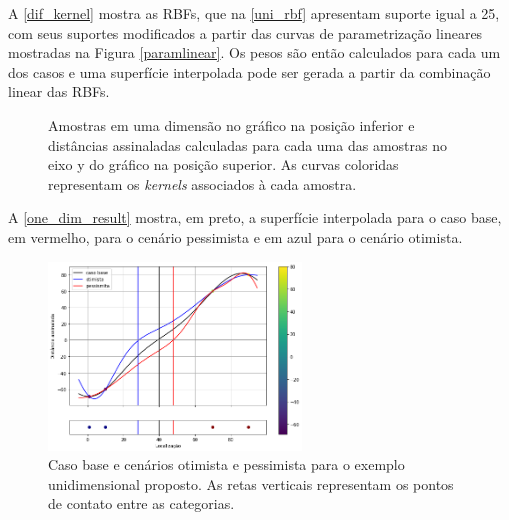 A \autoref{dif_kernel} mostra as RBFs, que na \autoref{uni_rbf} apresentam suporte igual a 25, com seus suportes modificados a partir das curvas de parametrização lineares mostradas na Figura \autoref{paramlinear}. Os pesos são então calculados para cada um dos casos e uma superfície interpolada pode ser gerada a partir da combinação linear das RBFs.

\begin{figure}[H] 
    \centering
    \caption{Amostras em uma dimensão no gráfico na posição inferior e distâncias assinaladas calculadas para cada uma das amostras no eixo y do gráfico na posição superior. As curvas coloridas representam os \textit{kernels} associados à cada amostra.} \label{dif_kernel}
     \hspace{1em}
\end{figure}

A \autoref{one_dim_result} mostra, em preto, a superfície interpolada para o caso base, em vermelho, para o cenário pessimista e em azul para o cenário otimista. 
 
\begin{figure}[H]
	\caption{\label{one_dim_result} Caso base e cenários otimista e pessimista para o exemplo unidimensional proposto. As retas verticais representam os pontos de contato entre as categorias.}
	\centering
		\includegraphics[width=0.6\textwidth]{capitulo_3/imagens/all_kernels.png}
\end{figure}

